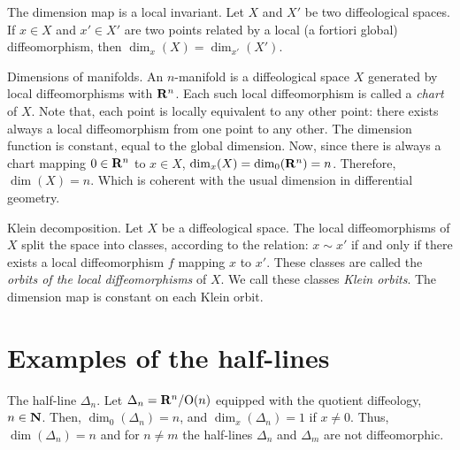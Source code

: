 \begin{Article}{The dimension map is a local invariant.}{}
  Let $X$ and $X'$ be two diffeological spaces.
  If $x \in X$ and $x' \in X'$ are two points related by a local (a fortiori global) diffeomorphism,
  then $\dim_x(X) = \dim_{x'}(X')$.
\end{Article}

\begin{Article}{Dimensions of manifolds.}{}
  An $n$-manifold is a diffeological space $X$ generated by local diffeomorphisms with $\mathbf{R}^n$.
  Each such local diffeomorphism is called a \emph{chart} of $X$.
  Note that,
  each point is locally equivalent to any other point:
  there exists always a local diffeomorphism from one point to any other.
  The dimension function is constant,
  equal to the global dimension.
  Now,
  since there is always a chart mapping $0 \in \mathbf{R}^n$ to $x \in X$,
  $\dim_x(X) = \dim_0(\mathbf{R}^n)= n$.
  Therefore,
  $\dim(X) = n$.
  Which is coherent with the usual dimension in differential geometry.
\end{Article}

\begin{Article}{Klein decomposition.}{}
  Let $X$ be a diffeological space.
  The local diffeomorphisms of $X$ split the space into classes,
  according to the  relation:
  $x \sim x'$ if and only if there exists a local diffeomorphism $f$ mapping $x$ to $x'$.
  These classes are called the {\em orbits of the local diffeomorphisms} of $X$.
  We call these classes \emph{Klein orbits}.
  The dimension map is constant on each Klein orbit.
\end{Article}

\section{Examples of the half-lines}

\begin{Article}{The half-line $\Delta_n$.}{}
  \label{Dimension-of-Rn/On}
  Let $\Delta_n = \mathbf{R}^n/\mathrm{O}(n)$ equipped with the quotient diffeology,
  $n \in \mathbf{N}$.
  Then,
  $\dim_0(\Delta_n) = n$,
  and $\dim_x(\Delta_n) = 1$ if $x \neq 0$.
  Thus, $\dim(\Delta_n) = n$ and for $n \neq m$ the half-lines $\Delta_n$ and $\Delta_m$ are not diffeomorphic.
\end{Article}

